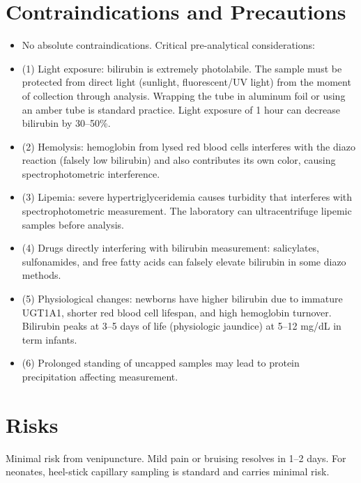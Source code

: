 \section*{Contraindications and Precautions}
\begin{itemize}
  \item No absolute contraindications. Critical pre-analytical considerations:
  \item (1) Light exposure: bilirubin is extremely photolabile. The sample must be protected from direct light (sunlight, fluorescent/UV light) from the moment of collection through analysis. Wrapping the tube in aluminum foil or using an amber tube is standard practice. Light exposure of 1 hour can decrease bilirubin by 30--50\%.
  \item (2) Hemolysis: hemoglobin from lysed red blood cells interferes with the diazo reaction (falsely low bilirubin) and also contributes its own color, causing spectrophotometric interference.
  \item (3) Lipemia: severe hypertriglyceridemia causes turbidity that interferes with spectrophotometric measurement. The laboratory can ultracentrifuge lipemic samples before analysis.
  \item (4) Drugs directly interfering with bilirubin measurement: salicylates, sulfonamides, and free fatty acids can falsely elevate bilirubin in some diazo methods.
  \item (5) Physiological changes: newborns have higher bilirubin due to immature UGT1A1, shorter red blood cell lifespan, and high hemoglobin turnover. Bilirubin peaks at 3--5 days of life (physiologic jaundice) at 5--12 mg/dL in term infants.
  \item (6) Prolonged standing of uncapped samples may lead to protein precipitation affecting measurement.
\end{itemize}
\section*{Risks}
Minimal risk from venipuncture. Mild pain or bruising resolves in 1--2 days. For neonates, heel-stick capillary sampling is standard and carries minimal risk.

